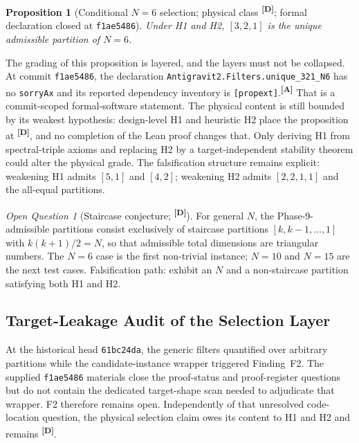 \documentclass[12pt,a4paper,twoside]{article}
\theoremstyle{plain}
\newtheorem{proposition}[theorem]{Proposition}
\theoremstyle{definition}
\theoremstyle{remark}
\newtheorem{openquestion}{Open Question}
\newcommand{\catmark}[1]{\textsuperscript{\textsf{\textbf{[#1]}}}}
\begin{document}
\begin{proposition}[Conditional $N=6$ selection; physical class \catmark{D}; formal declaration closed at \texttt{f1ae5486}]
\label{prop:unique321}
Under H1 and H2, $[3,2,1]$ is the unique admissible partition of $N=6$.
\end{proposition}

The grading of this proposition is layered, and the layers must not be
collapsed. At commit \texttt{f1ae5486}, the declaration
\texttt{Antigravit2.Filters.unique\_321\_N6} has no \texttt{sorryAx} and
its reported dependency inventory is \texttt{[propext]}.\catmark{A}
That is a commit-scoped formal-software statement. The physical content is
still bounded by its weakest hypothesis: design-level H1 and heuristic H2
place the proposition at \catmark{D}, and no completion of the Lean proof
changes that. Only deriving H1 from spectral-triple axioms and replacing H2
by a target-independent stability theorem could alter the physical grade.
The falsification structure remains explicit: weakening H1 admits $[5,1]$
and $[4,2]$; weakening H2 admits $[2,2,1,1]$ and the all-equal partitions.

\begin{openquestion}[Staircase conjecture; \catmark{D}]
\label{oq:staircase}
For general $N$, the Phase-9-admissible partitions consist exclusively of
staircase partitions $[k, k{-}1, \ldots, 1]$ with $k(k{+}1)/2 = N$, so
that admissible total dimensions are triangular numbers. The $N=6$ case
is the first non-trivial instance; $N=10$ and $N=15$ are the next test
cases. Falsification path: exhibit an $N$ and a non-staircase partition
satisfying both H1 and H2.
\end{openquestion}

\subsection{Target-Leakage Audit of the Selection Layer}
\label{subsec:selection-leakage}

At the historical head \texttt{61bc24da}, the generic filters quantified over
arbitrary partitions while the candidate-instance wrapper triggered Finding~F2.
The supplied \texttt{f1ae5486} materials close the proof-status and
proof-register questions but do not contain the dedicated target-shape scan
needed to adjudicate that wrapper. F2 therefore remains open. Independently of
that unresolved code-location question, the physical selection claim owes its
content to H1 and H2 and remains \catmark{D}.
\end{document}
